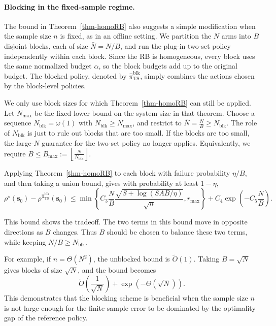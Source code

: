 \documentclass[mnsc,nonblindrev]{informs3}
\newcommand{\bms}{\bm{s}}
\begin{document}
\paragraph{Blocking in the fixed-sample regime.}
The bound in Theorem~\ref{thm-homoRB} also suggests a simple modification
when the sample size \(n\) is fixed, as in an offline setting. We partition
the \(N\) arms into \(B\) disjoint blocks, each of size \(\bar N=N/B\), and run
the plug-in two-set policy independently within each block. Since the RB is
homogeneous, every block uses the same normalized budget \(\alpha\), so the
block budgets add up to the original budget. The blocked policy, denoted by
\(\widehat\pi_{\mathrm{TS}}^{\mathrm{blk}}\), simply combines the actions
chosen by the block-level policies. 

We only use block sizes for which Theorem~\ref{thm-homoRB} can still be
applied. Let \(N_{\max}\) be the fixed lower bound on the system size in
that theorem. Choose a sequence \(N_{\mathrm{blk}}=\omega(1)\) with
\(N_{\mathrm{blk}}\ge N_{\max}\), and restrict to
\(
    \bar N=\frac{N}{B}\ge N_{\mathrm{blk}}.
\)
The role of \(N_{\mathrm{blk}}\) is just to rule out blocks that are too
small. If the blocks are too small, the large-\(N\) guarantee for the
two-set policy no longer applies. Equivalently, we require
\(
    B\le B_{\max}:=\left\lfloor\frac{N}{N_{\mathrm{blk}}}\right\rfloor .
\)

Applying Theorem~\ref{thm-homoRB} to each block with failure probability
\(\eta/B\), and then taking a union bound, gives with probability at least
\(1-\eta\),
\[
\rho^\star(\bms_0)-\rho^{\widehat\pi_{\mathrm{TS}}^{\mathrm{blk}}}(\bms_0)
\le
\min\left\{
C_3\frac{N}{B}
\frac{\sqrt{S+\log(SAB/\eta)}}{\sqrt n},
r_{\max}
\right\}
+
C_4\exp\left(-C_5\frac{N}{B}\right).
\]

This bound shows the tradeoff. The two terms in this bound move in opposite directions as \(B\) changes. Thus \(B\) should be chosen to balance these
two terms, while keeping \(N/B\ge N_{\mathrm{blk}}\).

For example, if \(n=\Theta(N^2)\), the unblocked bound is
\(\widetilde O(1)\). Taking \(B=\sqrt N\) gives blocks of size \(\sqrt N\),
and the bound becomes
\[
    \widetilde O\left(\frac{1}{\sqrt N}\right)
    +
    \exp(-\Theta(\sqrt N)).
\]
This demonstrates that the blocking scheme is beneficial when the sample size $n$ is not large enough for the finite-sample error to be dominated by the optimality gap of the reference policy.
\end{document}
